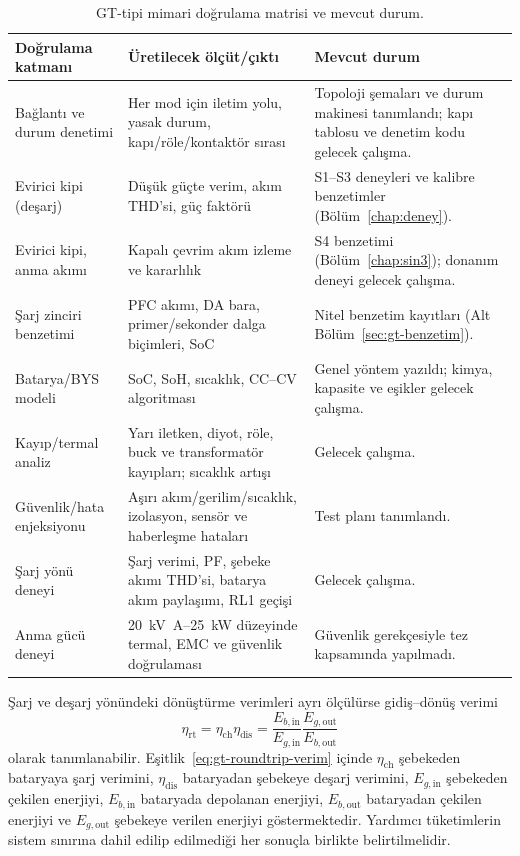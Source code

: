 \begin{table}[htbp]
  \centering
  \caption{GT-tipi mimari doğrulama matrisi ve mevcut durum.}
  \label{tab:gt-dogrulama-matrisi}
  \small
  \begin{tabularx}{\textwidth}{@{}p{}p{}X@{}}
    \toprule
    Doğrulama katmanı & Üretilecek ölçüt/çıktı & Mevcut durum \\
    \midrule
    Bağlantı ve durum denetimi & Her mod için iletim yolu, yasak durum, kapı/röle/kontaktör sırası & Topoloji şemaları ve durum makinesi tanımlandı; kapı tablosu ve denetim kodu gelecek çalışma. \\
    Evirici kipi (deşarj) & Düşük güçte verim, akım THD'si, güç faktörü & S1--S3 deneyleri ve kalibre benzetimler (Bölüm~\ref{chap:deney}). \\
    Evirici kipi, anma akımı & Kapalı çevrim akım izleme ve kararlılık & S4 benzetimi (Bölüm~\ref{chap:sin3}); donanım deneyi gelecek çalışma. \\
    Şarj zinciri benzetimi & PFC akımı, DA bara, primer/sekonder dalga biçimleri, SoC & Nitel benzetim kayıtları (Alt Bölüm~\ref{sec:gt-benzetim}). \\
    Batarya/BYS modeli & SoC, SoH, sıcaklık, CC--CV algoritması & Genel yöntem yazıldı; kimya, kapasite ve eşikler gelecek çalışma. \\
    Kayıp/termal analiz & Yarı iletken, diyot, röle, buck ve transformatör kayıpları; sıcaklık artışı & Gelecek çalışma. \\
    Güvenlik/hata enjeksiyonu & Aşırı akım/gerilim/sıcaklık, izolasyon, sensör ve haberleşme hataları & Test planı tanımlandı. \\
    Şarj yönü deneyi & Şarj verimi, PF, şebeke akımı THD'si, batarya akım paylaşımı, RL1 geçişi & Gelecek çalışma. \\
    Anma gücü deneyi & \SI{20}{\kilo\volt\ampere}--\SI{25}{\kilo\watt} düzeyinde termal, EMC ve güvenlik doğrulaması & Güvenlik gerekçesiyle tez kapsamında yapılmadı. \\
    \bottomrule
  \end{tabularx}
\end{table}

Şarj ve deşarj yönündeki dönüştürme verimleri ayrı ölçülürse gidiş--dönüş verimi
\begin{equation}
  \eta_{\mathrm{rt}}=\eta_{\mathrm{ch}}\eta_{\mathrm{dis}}
  =\frac{E_{b,\mathrm{in}}}{E_{g,\mathrm{in}}}
   \frac{E_{g,\mathrm{out}}}{E_{b,\mathrm{out}}}
  \label{eq:gt-roundtrip-verim}
\end{equation}
olarak tanımlanabilir. Eşitlik~\eqref{eq:gt-roundtrip-verim} içinde $\eta_{\mathrm{ch}}$ şebekeden bataryaya şarj verimini, $\eta_{\mathrm{dis}}$ bataryadan şebekeye deşarj verimini, $E_{g,\mathrm{in}}$ şebekeden çekilen enerjiyi, $E_{b,\mathrm{in}}$ bataryada depolanan enerjiyi, $E_{b,\mathrm{out}}$ bataryadan çekilen enerjiyi ve $E_{g,\mathrm{out}}$ şebekeye verilen enerjiyi göstermektedir. Yardımcı tüketimlerin sistem sınırına dahil edilip edilmediği her sonuçla birlikte belirtilmelidir.

